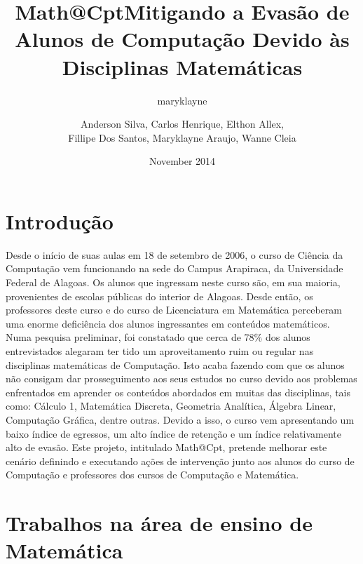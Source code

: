 \documentclass[12pt,a4paper]{article}
\title{Math@Cpt}
\author{maryklayne }
\date{November 2014}
\title{Mitigando a Evasão de Alunos de Computação Devido às Disciplinas Matemáticas}
\author{Anderson Silva, 
Carlos Henrique, 
Elthon Allex,\\
Fillipe Dos Santos, 
Maryklayne Araujo, 
Wanne Cleia}
\begin{document}
 

\maketitle

\section{Introdução}
Desde o início de suas aulas em 18 de setembro de 2006, o curso de Ciência da Computação vem funcionando na sede do Campus Arapiraca, da Universidade Federal de Alagoas. Os alunos que ingressam neste curso são, em sua maioria, provenientes de escolas públicas do interior de Alagoas. Desde então, os professores deste curso e do curso de Licenciatura em Matemática perceberam uma enorme deficiência dos alunos ingressantes em conteúdos matemáticos. Numa pesquisa preliminar, foi constatado que cerca de 78\% dos alunos entrevistados alegaram ter tido um  aproveitamento ruim ou regular nas disciplinas matemáticas de Computação. Isto acaba fazendo com que os alunos não consigam dar prosseguimento aos seus estudos no curso devido aos problemas enfrentados em aprender os conteúdos abordados em muitas das disciplinas, tais como: Cálculo 1, Matemática Discreta, Geometria Analítica, Álgebra Linear, Computação Gráfica, dentre outras. Devido a isso, o curso vem apresentando um baixo índice de egressos, um alto índice de retenção e um índice relativamente alto de evasão. Este projeto, intitulado Math@Cpt, pretende melhorar este cenário definindo e executando ações de intervenção junto aos alunos do curso de Computação e professores dos cursos de Computação e Matemática.

\section{Trabalhos na área de ensino de Matemática}
\end{document}
